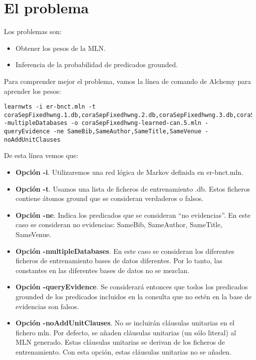 \section{El problema}

Los problemas son:

\begin{itemize}
\item Obtener los pesos de la MLN.
\item Inferencia de la probabilidad de predicados grounded.
\end{itemize}

Para comprender mejor el problema, vamos la línea de comando de Alchemy para aprender los pesos:

\begin{verbatim}
learnwts -i er-bnct.mln -t coraSepFixedhwng.1.db,coraSepFixedhwng.2.db,coraSepFixedhwng.3.db,coraSepFixedhwng.4.db -multipleDatabases -o coraSepFixedhwng-learned-can.5.mln -queryEvidence -ne SameBib,SameAuthor,SameTitle,SameVenue -noAddUnitClauses
\end{verbatim}

De esta línea vemos que:

\begin{itemize}

\item {\bf Opción -i}. Utilizaremos una red lógica de Markov definida en er-bnct.mln.
\item {\bf Opción -t}. Usamos una lista de ficheros de entrenamiento .db. Estos ficheros contiene átomos ground que se consideran verdaderos o falsos.
\item {\bf Opción -ne}. Indica los predicados que se consideran ``no evidencias''. En este caso se consideran no evidencias: SameBib, SameAuthor, SameTitle, SameVenue.
\item {\bf Opción -multipleDatabases}. En este caso se consideran los diferentes ficheros de entrenamiento bases de datos diferentes. Por lo tanto, las constantes en las diferentes bases de datos no se mezclan.
\item {\bf Opción -queryEvidence}. Se considerará entonces que todos los predicados grounded de los predicados incluidos en la consulta que no estén en la base de evidencias son falsos.
\item {\bf Opción -noAddUnitClauses}. No se incluirán cláusulas unitarias en el fichero mln. Por defecto, se añaden cláusulas unitarias (un sólo literal) al MLN generado. Estas cláusulas unitarias se derivan de los ficheros de entrenamiento. Con esta opción, estas cláusulas unitarias no se añaden.

\end{itemize}

